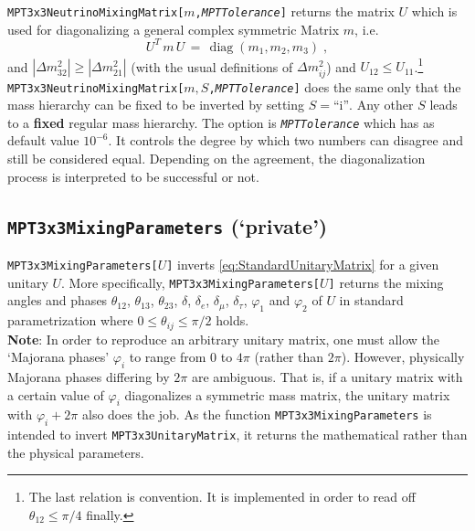 \documentclass[12pt,a4paper,twoside]{scrartcl}
\newcommand{\function}[1]{{\tt #1}}
\newcommand{\optparam}[1]{{\tt\em #1}}
\DeclareMathOperator{\diag}{diag}
\numberwithin{equation}{section}
\numberwithin{table}{section}
\begin{document}
\function{MPT3x3NeutrinoMixingMatrix[$m$,\optparam{MPTTolerance}]} 
returns the matrix $U$ which is used for diagonalizing a general 
complex symmetric Matrix $m$, i.e. 
\begin{equation}
 U^T\,m\,U
 \,=\,\diag(m_1,m_2,m_3) \;,
\end{equation}
and $|\Delta m_{32}^2|\ge|\Delta m_{21}^2|$ (with the usual definitions of
$\Delta m^2_{ij}$) and $U_{12}\le U_{11}$.\footnote{
The last relation is convention. It is implemented in order to read off
$\theta_{12}\le\pi/4$ finally.}\\ 
\function{MPT3x3NeutrinoMixingMatrix[$m,S$,\optparam{MPTTolerance}]} 
does the same only that the mass hierarchy can be fixed to be inverted by 
setting $S=\text{``i''}$. 
Any other $S$ leads to a \textbf{fixed} regular mass hierarchy.
The option is \optparam{MPTTolerance} which has as default value $10^{-6}$. It
controls the degree by which two numbers can disagree and still be considered
equal. Depending on the agreement, the diagonalization process is interpreted
to be successful or not.


\subsection*{\function{MPT3x3MixingParameters} (`private')}
\addcontentsline{toc}{subsection}{\function{MPT3x3MixingParameters}}

\function{MPT3x3MixingParameters[$U$]} inverts \eqref{eq:StandardUnitaryMatrix}
for a given  unitary $U$. More specifically,
\function{MPT3x3MixingParameters[$U$]} returns the mixing angles and phases 
$\theta_{12}$, $\theta_{13}$, $\theta_{23}$, $\delta$, $\delta_e$,
$\delta_\mu$, $\delta_\tau$, $\varphi_1$ and $\varphi_2$ of $U$ in standard
parametrization  where $0\le \theta_{ij}\le \pi/2$ holds.\\ 
\textbf{Note}: In
order to reproduce an arbitrary unitary matrix, one must allow the `Majorana
phases' $\varphi_i$ to range from $0$ to $4\pi$ (rather than $2\pi$).  However,
physically Majorana phases differing by $2\pi$ are ambiguous.  That is, if a
unitary matrix with a certain value of $\varphi_i$ diagonalizes a symmetric
mass matrix, the unitary matrix with  $\varphi_i+2\pi$ also does the job. As
the function \function{MPT3x3MixingParameters} is intended to invert 
\function{MPT3x3UnitaryMatrix}, it returns the mathematical rather than the
physical parameters.

\end{document}
